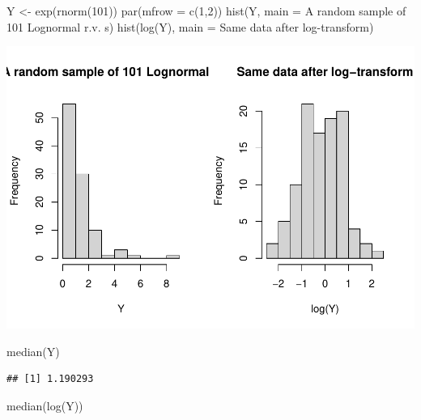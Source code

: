 \documentclass[
]{book}
\newenvironment{Shaded}{\begin{snugshade}}{\end{snugshade}}
\newcommand{\AttributeTok}[1]{\textcolor[rgb]{0.77,0.63,0.00}{#1}}
\newcommand{\DecValTok}[1]{\textcolor[rgb]{0.00,0.00,0.81}{#1}}
\newcommand{\FunctionTok}[1]{\textcolor[rgb]{0.00,0.00,0.00}{#1}}
\newcommand{\NormalTok}[1]{#1}
\newcommand{\OtherTok}[1]{\textcolor[rgb]{0.56,0.35,0.01}{#1}}
\newcommand{\StringTok}[1]{\textcolor[rgb]{0.31,0.60,0.02}{#1}}
\begin{document}
\begin{Shaded}
\begin{Highlighting}[]
\NormalTok{Y }\OtherTok{\textless{}{-}} \FunctionTok{exp}\NormalTok{(}\FunctionTok{rnorm}\NormalTok{(}\DecValTok{101}\NormalTok{))}
\FunctionTok{par}\NormalTok{(}\AttributeTok{mfrow =} \FunctionTok{c}\NormalTok{(}\DecValTok{1}\NormalTok{,}\DecValTok{2}\NormalTok{))}
\FunctionTok{hist}\NormalTok{(Y, }\AttributeTok{main =} \StringTok{\textquotesingle{}A random sample of 101 Lognormal r.v. s\textquotesingle{}}\NormalTok{)}
\FunctionTok{hist}\NormalTok{(}\FunctionTok{log}\NormalTok{(Y), }\AttributeTok{main =} \StringTok{\textquotesingle{}Same data after log{-}transform\textquotesingle{}}\NormalTok{)}
\end{Highlighting}
\end{Shaded}

\includegraphics{04-Non-Normal-Responses_files/figure-latex/unnamed-chunk-1-1.pdf}

\begin{Shaded}
\begin{Highlighting}[]
\FunctionTok{median}\NormalTok{(Y)}
\end{Highlighting}
\end{Shaded}

\begin{verbatim}
## [1] 1.190293
\end{verbatim}

\begin{Shaded}
\begin{Highlighting}[]
\FunctionTok{median}\NormalTok{(}\FunctionTok{log}\NormalTok{(Y))}
\end{Highlighting}
\end{Shaded}
\end{document}
